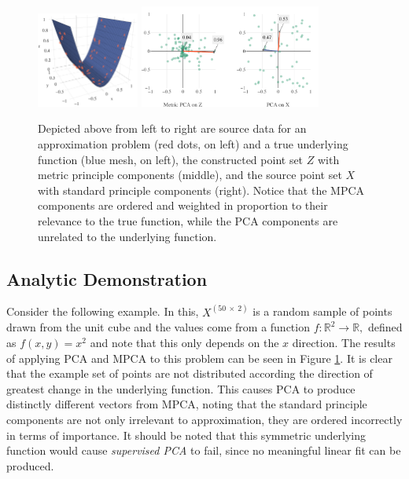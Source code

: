 \documentclass{scspaperproc}
\theoremstyle{scsthe}
\begin{document}
\begin{figure}
  \centering
  \includegraphics[width=0.30\textwidth]{1-mpca-pca.png}
  \hspace{5mm}
  \includegraphics[width=0.53\textwidth]{1-mpca-pca.pdf}
  \caption{Depicted above from left to right are source data for an
    approximation problem (red dots, on left) and a true underlying
    function (blue mesh, on left), the constructed point set $Z$ with
    metric principle components (middle), and the source point set $X$
    with standard principle components (right). Notice that the MPCA
    components are ordered and weighted in proportion to their
    relevance to the true function, while the PCA components are
    unrelated to the underlying function.}
  \label{fig:analytic}
\end{figure}


\subsection{Analytic Demonstration}

Consider the following example. In this, $X^{(50\ \times\ 2)}$ is a
random sample of points drawn from the unit cube and the values come
from a function $f: \mathbb{R}^2 \rightarrow \mathbb{R},$ defined as
$f(x,y) = x^2$ and note that this only depends on the $x$
direction. The results of applying PCA and MPCA to this problem can be
seen in Figure \ref{fig:analytic}. It is clear that the example set of
points are not distributed according the direction of greatest change
in the underlying function. This causes PCA to produce distinctly
different vectors from MPCA, noting that the standard principle
components are not only irrelevant to approximation, they are ordered
incorrectly in terms of importance. It should be noted that this
symmetric underlying function would cause \textit{supervised PCA} to
fail, since no meaningful linear fit can be produced.
\end{document}
